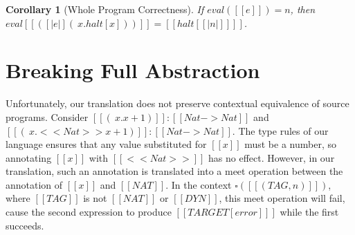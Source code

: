 \documentclass[11pt]{article}
\newtheorem{corollary}{Corollary}[section]
\begin{document}
\begin{corollary}[Whole Program Correctness] 
	If ${eval([[e]])=n}$, then ${eval[[ ([|e|](\ x . halt [x]) )]]=[[halt [ [|n|] ] ]]}$.
\end{corollary}
 
\section{Breaking Full Abstraction}

Unfortunately, our translation does not preserve contextual equivalence of source programs.
Consider $[[(\ x . x + 1)]] : [[Nat -> Nat]]$ and $[[(\ x . <<Nat>>x + 1)]] : [[Nat -> Nat]]$.
The type rules of our language ensures that any value substituted for $[[x]]$ must be a number,
so annotating $[[x]]$ with $[[<<Nat>>]]$ has no effect.
However, in our translation, such an annotation is translated into a meet operation between the annotation
of $[[x]]$ and $[[NAT]]$. In the context $\square([[(TAG, n)]])$, where $[[TAG]]$ is not $[[NAT]]$ or $[[DYN]]$,
this meet operation will fail, cause the second expression to produce $[[ TARGET[error] ]]$ while the first succeeds.
 

  
\end{document}
